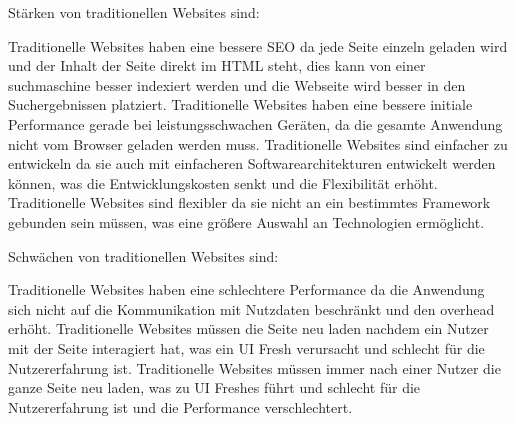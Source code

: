 Stärken von traditionellen Websites sind:

Traditionelle Websites haben eine bessere \ac{SEO} da jede Seite einzeln geladen wird und der Inhalt der Seite direkt im \ac{HTML} steht,
dies kann von einer \gls{suchmaschine} besser indexiert werden und die Webseite wird besser in den Suchergebnissen platziert.
Traditionelle Websites haben eine bessere initiale Performance gerade bei leistungsschwachen Geräten, da die gesamte Anwendung nicht vom Browser geladen werden muss.
Traditionelle Websites sind einfacher zu entwickeln da sie auch mit einfacheren Softwarearchitekturen entwickelt werden können, was die Entwicklungskosten senkt und die Flexibilität erhöht.
Traditionelle Websites sind flexibler da sie nicht an ein bestimmtes Framework gebunden sein müssen, was eine größere Auswahl an Technologien ermöglicht.

Schwächen von traditionellen Websites sind:

Traditionelle Websites haben eine schlechtere Performance da die Anwendung sich nicht auf die Kommunikation mit Nutzdaten beschränkt und den overhead erhöht.
Traditionelle Websites müssen die Seite neu laden nachdem ein Nutzer mit der Seite interagiert hat, was ein \ac{UI} Fresh verursacht und schlecht für die Nutzererfahrung ist.
Traditionelle Websites müssen immer nach einer Nutzer die ganze Seite neu laden, was zu \ac{UI} Freshes führt und schlecht für die Nutzererfahrung ist und die Performance verschlechtert.

